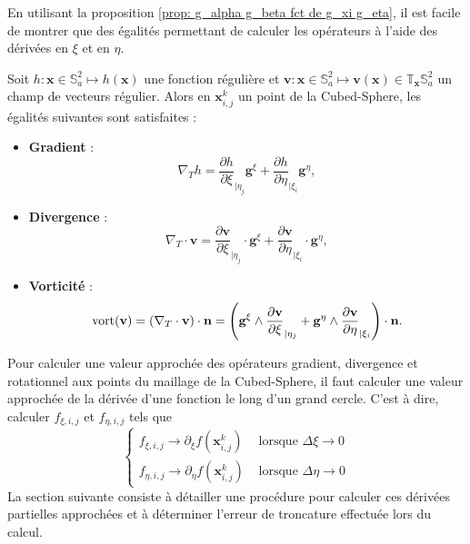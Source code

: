 En utilisant la proposition \ref{prop: g_alpha g_beta fct de g_xi g_eta}, il est facile de montrer que des égalités permettant de calculer les opérateurs à l'aide des dérivées en $\xi$ et en $\eta$.

\begin{theoreme}
Soit $h : \mathbf{x} \in \mathbb{S}_a^2 \mapsto h(\mathbf{x})$ une fonction régulière et $\mathbf{v} : \mathbf{x} \in \mathbb{S}_a^2 \mapsto \mathbf{v}(\mathbf{x}) \in \mathbb{T}_{\mathbf{x}} \mathbb{S}_a^2$ un champ de vecteurs régulier. Alors en $\mathbf{x}_{i,j}^k$ un point de la Cubed-Sphere, les égalités suivantes sont satisfaites :
\begin{itemize}
\item \textbf{Gradient} :
\begin{equation}
\nabla_T h = \dfrac{\partial h}{\partial \xi}_{|\eta_j} \mathbf{g}^{\xi} + \dfrac{\partial h}{\partial \eta}_{|\xi_i} \mathbf{g}^{\eta},
\end{equation}

\item \textbf{Divergence} :
\begin{equation}
\nabla_T \cdot \mathbf{v} = \dfrac{\partial \mathbf{v}}{\partial \xi}_{|\eta_j} \cdot \mathbf{g}^{\xi} + \dfrac{\partial \mathbf{v}}{\partial \eta}_{|\xi_i} \cdot \mathbf{g}^{\eta},
\label{eq:divergence_v1}
\end{equation}

\item \textbf{Vorticité} :
\begin{equation}
\text{vort}( \mathbf{v} ) = \left( \nabla_T \cdot \mathbf{v} \right) \cdot \mathbf{n} =  \left( \mathbf{g}^{\xi} \wedge \dfrac{\partial \mathbf{v}}{\partial \xi}_{|\eta_j} + \mathbf{g}^{\eta} \wedge \dfrac{\partial \mathbf{v}}{\partial \eta}_{|\xi_i} \right) \cdot \mathbf{n}.
\end{equation}
\end{itemize} 
\end{theoreme}

Pour calculer une valeur approchée des opérateurs gradient, divergence et rotationnel aux points du maillage de la Cubed-Sphere, il faut calculer une valeur approchée de la dérivée d'une fonction le long d'un grand cercle. C'est à dire, calculer $f_{\xi,i,j}$ et $f_{\eta,i,j}$ tels que 
\begin{equation}
\left\lbrace
\begin{array}{rl}
f_{\xi,i,j} \rightarrow \partial_{\xi} f ( \mathbf{x}_{i,j}^k) & \text{ lorsque } \Delta \xi \rightarrow 0\\
f_{\eta,i,j} \rightarrow \partial_{\eta} f ( \mathbf{x}_{i,j}^k) & \text{ lorsque } \Delta \eta \rightarrow 0
\end{array}
\right.
\end{equation}
La section suivante consiste à détailler une procédure pour calculer ces dérivées partielles approchées et à déterminer l'erreur de troncature effectuée lors du calcul.





